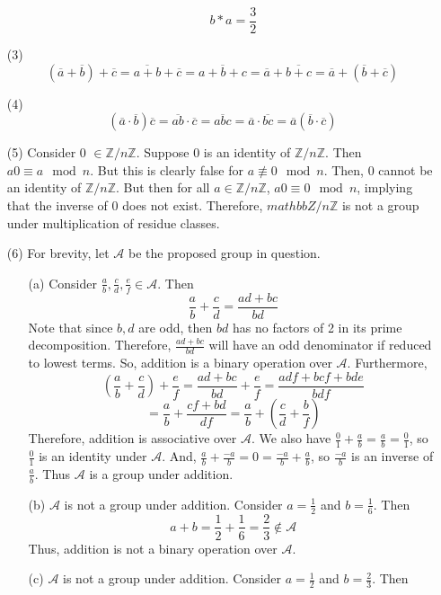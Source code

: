 \documentclass[12pt]{article}
\begin{document}
\begin{itemize}
\begin{itemize}
$$b * a = \frac{3}{2}$$
\end{itemize}
\item[(3)]
$$(\overline{a} + \overline{b}) + \overline{c} = \overline{a + b} + \overline{c} = \overline{a + b + c} = \overline{a} + \overline{b + c} = \overline{a} + (\overline{b} + \overline{c})$$
\item[(4)]
$$(\overline{a} \cdot \overline{b})\overline{c} = \overline{ab} \cdot \overline{c} = \overline{abc} = \overline{a} \cdot \overline{bc} = \overline{a}(\overline{b} \cdot \overline{c})$$
\item[(5)]
Consider 0 $\in \mathbb{Z}/n\mathbb{Z}$. Suppose 0 is an identity of $\mathbb{Z}/n\mathbb{Z}$. Then $a0 \equiv a \mod n$. But this is clearly false for $a \not \equiv 0 \mod n$. Then, 0 cannot be an identity of $\mathbb{Z}/n\mathbb{Z}$. But then for all $a \in \mathbb{Z}/n\mathbb{Z}$, $a0 \equiv 0 \mod n$, implying that the inverse of 0 does not exist. Therefore, $mathbb{Z}/n\mathbb{Z}$ is not a group under multiplication of residue classes.
\item[(6)]
For brevity, let $\mathcal{A}$ be the proposed group in question.
\begin{itemize}
\item[(a)]
Consider $\frac{a}{b}, \frac{c}{d}, \frac{e}{f} \in \mathcal{A}$. Then
$$\frac{a}{b} + \frac{c}{d} = \frac{ad + bc}{bd}$$
Note that since $b, d$ are odd, then $bd$ has no factors of 2 in its prime decomposition. Therefore, $\frac{ad + bc}{bd}$ will have an odd denominator if reduced to lowest terms. So, addition is a binary operation over $\mathcal{A}$. Furthermore, 
$$\left(\frac{a}{b} + \frac{c}{d} \right) + \frac{e}{f} = \frac{ad + bc}{bd} + \frac{e}{f} = \frac{adf + bcf + bde}{bdf}$$
$$ = \frac{a}{b} + \frac{cf + bd}{df} = \frac{a}{b} + \left(\frac{c}{d} + \frac{b}{f}\right)$$
Therefore, addition is associative over $\mathcal{A}$. We also have $\frac{0}{1} + \frac{a}{b} = \frac{a}{b} = \frac{0}{1}$, so $\frac{0}{1}$ is an identity under $\mathcal{A}$. And, $\frac{a}{b} + \frac{-a}{b} = 0 = \frac{-a}{b} + \frac{a}{b}$, so $\frac{-a}{b}$ is an inverse of $\frac{a}{b}$. Thus $\mathcal{A}$ is a group under addition.
\item[(b)]$\mathcal{A}$ is not a group under addition. Consider $a = \frac{1}{2}$ and $b = \frac{1}{6}$. Then
$$a + b = \frac{1}{2} + \frac{1}{6} = \frac{2}{3} \not \in \mathcal{A}$$
Thus, addition is not a binary operation over $\mathcal{A}$.
\item[(c)]$\mathcal{A}$ is not a group under addition. Consider $a = \frac{1}{2}$ and $b = \frac{2}{3}$. Then

\end{itemize}
\end{itemize}
\end{document}
